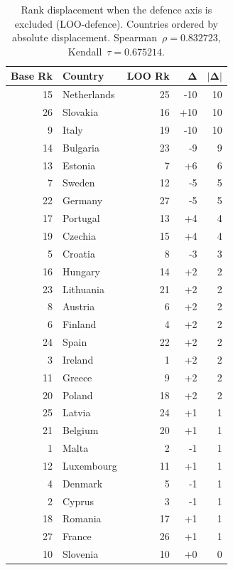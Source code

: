 \begin{table}[htbp]
\centering
\caption{Rank displacement when the defence axis is excluded (LOO-defence).  Countries ordered by absolute displacement.  Spearman~$\rho = 0.832723$, Kendall~$\tau = 0.675214$.}
\label{tab:loo-defence-ranks}
\begin{tabular}{@{}r l r r r@{}}
\toprule
{\textbf{Base Rk}} & {\textbf{Country}} & {\textbf{LOO Rk}} & {$\boldsymbol{\Delta}$} & {$|\boldsymbol{\Delta}|$} \\
\midrule
  15 & Netherlands & 25 & -10 & 10 \\
  26 & Slovakia & 16 & +10 & 10 \\
  9 & Italy & 19 & -10 & 10 \\
  14 & Bulgaria & 23 & -9 & 9 \\
  13 & Estonia & 7 & +6 & 6 \\
  7 & Sweden & 12 & -5 & 5 \\
  22 & Germany & 27 & -5 & 5 \\
  17 & Portugal & 13 & +4 & 4 \\
  19 & Czechia & 15 & +4 & 4 \\
  5 & Croatia & 8 & -3 & 3 \\
  16 & Hungary & 14 & +2 & 2 \\
  23 & Lithuania & 21 & +2 & 2 \\
  8 & Austria & 6 & +2 & 2 \\
  6 & Finland & 4 & +2 & 2 \\
  24 & Spain & 22 & +2 & 2 \\
  3 & Ireland & 1 & +2 & 2 \\
  11 & Greece & 9 & +2 & 2 \\
  20 & Poland & 18 & +2 & 2 \\
  25 & Latvia & 24 & +1 & 1 \\
  21 & Belgium & 20 & +1 & 1 \\
  1 & Malta & 2 & -1 & 1 \\
  12 & Luxembourg & 11 & +1 & 1 \\
  4 & Denmark & 5 & -1 & 1 \\
  2 & Cyprus & 3 & -1 & 1 \\
  18 & Romania & 17 & +1 & 1 \\
  27 & France & 26 & +1 & 1 \\
  10 & Slovenia & 10 & +0 & 0 \\
\bottomrule
\end{tabular}
\end{table}